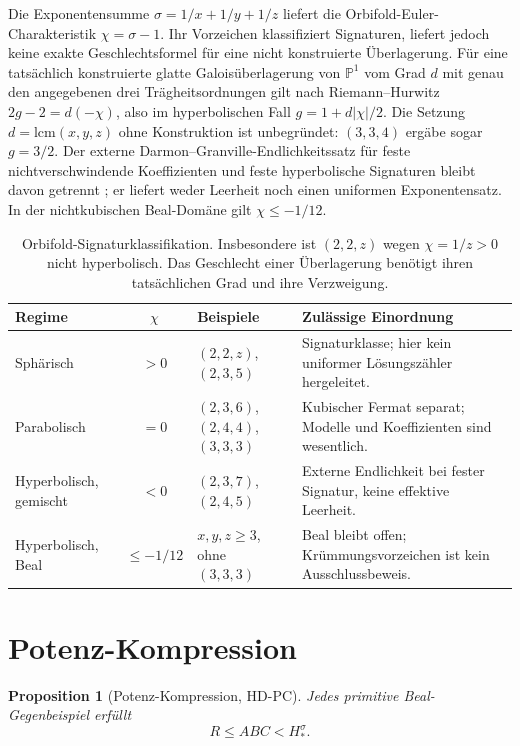 \documentclass[11pt,a4paper]{article}
\newtheorem{proposition}[theorem]{Proposition}
\begin{document}
Die Exponentensumme $\sigma=1/x+1/y+1/z$ liefert die
Orbifold-Euler-Charakteristik $\chi=\sigma-1$. Ihr Vorzeichen klassifiziert
Signaturen, liefert jedoch keine exakte Geschlechtsformel für eine
nicht konstruierte Überlagerung.
Für eine tatsächlich konstruierte glatte Galoisüberlagerung von
$\mathbb P^1$ vom Grad $d$ mit genau den angegebenen drei Trägheitsordnungen
gilt nach Riemann--Hurwitz $2g-2=d(-\chi)$, also im hyperbolischen Fall
$g=1+d|\chi|/2$. Die Setzung $d=\mathrm{lcm}(x,y,z)$ ohne Konstruktion
ist unbegründet: $(3,3,4)$ ergäbe sogar $g=3/2$.
Der externe Darmon--Granville-Endlichkeitssatz für feste nichtverschwindende
Koeffizienten und feste hyperbolische Signaturen bleibt davon getrennt
\cite{DarmonGranville1995}; er liefert weder Leerheit noch einen uniformen
Exponentensatz. In der nichtkubischen Beal-Domäne gilt $\chi\le-1/12$.
\begin{table}[!htbp]
\centering\small
\begin{tabularx}{\textwidth}{@{}l c >{\raggedright\arraybackslash}p{3.1cm} >{\raggedright\arraybackslash}X@{}}
\toprule
Regime & $\chi$ & Beispiele & Zulässige Einordnung\\
\midrule
Sphärisch & $>0$ & $(2,2,z)$, $(2,3,5)$ & Signaturklasse; hier kein uniformer Lösungszähler hergeleitet.\\
\addlinespace
Parabolisch & $=0$ & $(2,3,6)$, $(2,4,4)$, $(3,3,3)$ & Kubischer Fermat separat; Modelle und Koeffizienten sind wesentlich.\\
\addlinespace
Hyperbolisch, gemischt & $<0$ & $(2,3,7)$, $(2,4,5)$ & Externe Endlichkeit bei fester Signatur, keine effektive Leerheit.\\
\addlinespace
Hyperbolisch, Beal & $\le-1/12$ & $x,y,z\ge3$, ohne $(3,3,3)$ & Beal bleibt offen; Krümmungsvorzeichen ist kein Ausschlussbeweis.\\
\bottomrule
\end{tabularx}
\caption{Orbifold-Signaturklassifikation. Insbesondere ist $(2,2,z)$ wegen $\chi=1/z>0$ nicht hyperbolisch. Das Geschlecht einer Überlagerung benötigt ihren tatsächlichen Grad und ihre Verzweigung.}
\label{tab:regime_matrix}
\end{table}

\section{Potenz-Kompression}

\begin{proposition}[Potenz-Kompression, HD-PC]
\label{prop:compression}
Jedes primitive Beal-Gegenbeispiel erfüllt
\[
  R \le ABC < H_*^{\sigma}.
\]
\end{proposition}
\end{document}
